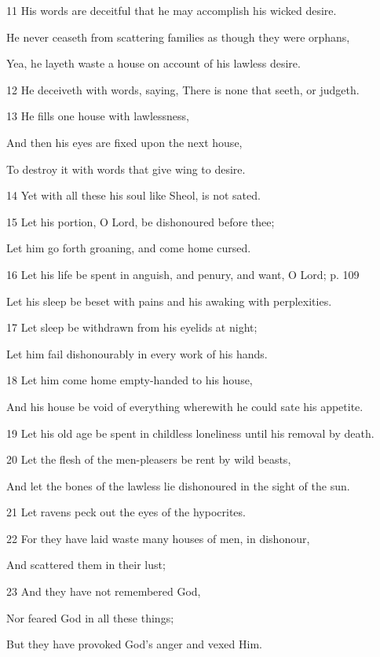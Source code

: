 \par 11 His words are deceitful that he may accomplish his wicked desire.
\par  He never ceaseth from scattering families as though they were orphans,
\par  Yea, he layeth waste a house on account of his lawless desire.
\par 12 He deceiveth with words, saying, There is none that seeth, or judgeth.
\par 13 He fills one house with lawlessness,
\par  And then his eyes are fixed upon the next house,
\par  To destroy it with words that give wing to desire.
\par 14 Yet with all these his soul like Sheol, is not sated.
\par    
\par 15 Let his portion, O Lord, be dishonoured before thee;
\par  Let him go forth groaning, and come home cursed.
\par 16 Let his life be spent in anguish, and penury, and want, O Lord; p. 109
\par  Let his sleep be beset with pains and his awaking with perplexities.
\par 17 Let sleep be withdrawn from his eyelids at night;
\par  Let him fail dishonourably in every work of his hands.
\par 18 Let him come home empty-handed to his house,
\par  And his house be void of everything wherewith he could sate his appetite.
\par 19 Let his old age be spent in childless loneliness until his removal by death.
\par    
\par 20 Let the flesh of the men-pleasers be rent by wild beasts,
\par  And let the bones of the lawless lie dishonoured in the sight of the sun.
\par 21 Let ravens peck out the eyes of the hypocrites.
\par 22 For they have laid waste many houses of men, in dishonour,
\par  And scattered them in their lust;
\par 23 And they have not remembered God,
\par  Nor feared God in all these things;
\par  But they have provoked God's anger and vexed Him.

